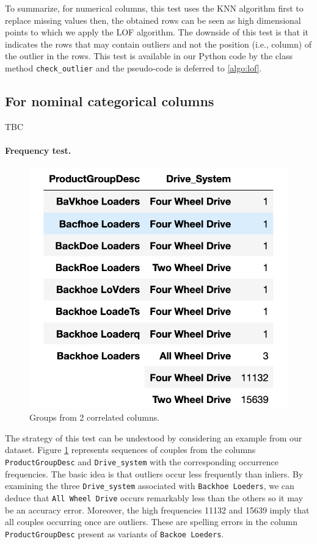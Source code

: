 \documentclass{article}
\begin{document}
To summarize, for numerical columns, this test uses the KNN algorithm first to replace missing values then, the obtained rows can be seen as high dimensional points to which we apply the LOF algorithm.
The downside of this test is that it indicates the rows that may contain outliers and not the position (i.e., column) of the outlier in the rows.
This test is available in our Python code by the class method \texttt{check\_outlier} and the pseudo-code is deferred to \ref{algo:lof}.
\subsection{For nominal categorical columns} %
TBC
\paragraph{Frequency test.}
\begin{figure}[h]
    \centering
    \includegraphics[width=0.5\linewidth]{picture/logic_err.png}
    \caption{Groups from 2 correlated columns.}
    \label{fig:logic_err}
\end{figure}
The strategy of this test can be undestood by considering an example from our dataset.
Figure \ref{fig:logic_err} represents sequences of couples from the columns \texttt{ProductGroupDesc} and \texttt{Drive\_system} with the corresponding occurrence frequencies.
The basic idea is that outliers occur less frequently than inliers.
By examining the three \texttt{Drive\_system} associated with \texttt{Backhoe Loeders}, we can deduce that \texttt{All Wheel Drive} occurs remarkably less than the others so it may be an accuracy error.
Moreover, the high frequencies 11132 and 15639 imply that all couples occurring once are outliers.
These are spelling errors in the column \texttt{ProductGroupDesc} present as variants of \texttt{Backoe Loeders}.
\end{document}
